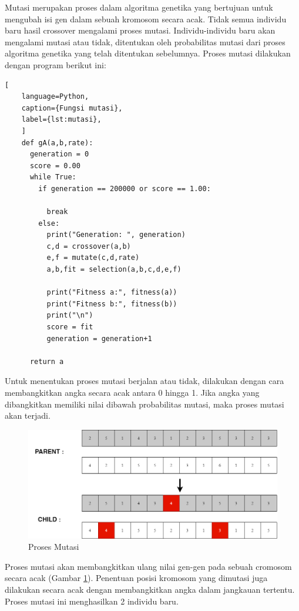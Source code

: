   Mutasi merupakan proses dalam algoritma genetika yang bertujuan untuk mengubah isi gen dalam sebuah kromosom secara acak. 
  Tidak semua individu baru hasil crossover \linebreak mengalami proses mutasi. 
  Individu-individu baru akan mengalami mutasi atau tidak, ditentukan oleh probabilitas mutasi dari proses algoritma genetika yang telah ditentukan sebelumnya. 
  Proses mutasi dilakukan dengan program berikut ini:
  \begin{lstlisting}[
    language=Python,
    caption={Fungsi mutasi},
    label={lst:mutasi},
    ]
    def gA(a,b,rate):
      generation = 0
      score = 0.00
      while True:
        if generation == 200000 or score == 1.00:
          
          break
        else:
          print("Generation: ", generation)
          c,d = crossover(a,b)
          e,f = mutate(c,d,rate)
          a,b,fit = selection(a,b,c,d,e,f)
          
          print("Fitness a:", fitness(a))
          print("Fitness b:", fitness(b))
          print("\n")
          score = fit
          generation = generation+1

      return a    
  \end{lstlisting}
  Untuk menentukan proses mutasi berjalan atau tidak, dilakukan dengan cara membangkitkan angka secara acak antara 0 hingga 1. 
  Jika angka yang dibangkitkan memiliki nilai dibawah probabilitas mutasi, maka proses mutasi akan terjadi.
  \begin{figure} [ht] \centering
    \includegraphics[scale=0.4]{gambar/mutation.png}
    \caption{Proses Mutasi}
    \label{fig:mutate}
  \end{figure}

  Proses mutasi akan membangkitkan ulang nilai gen-gen pada sebuah cromosom secara acak (Gambar \ref{fig:mutate}). Penentuan posisi kromosom yang dimutasi juga dilakukan secara acak dengan membangkitkan angka dalam jangkauan tertentu. 
  Proses mutasi ini menghasilkan 2 individu baru.
